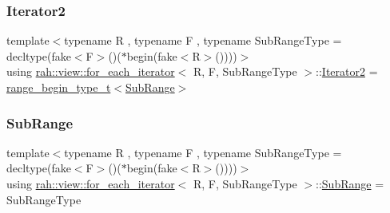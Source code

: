 \mbox{\label{structrah_1_1view_1_1for__each__iterator_a13108a8db132a8157375f81cf9b12ce1}} 
\subsubsection{\texorpdfstring{Iterator2}{Iterator2}}
{\footnotesize\ttfamily template$<$typename R , typename F , typename Sub\+Range\+Type  = decltype(fake$<$\+F$>$()($\ast$begin(fake$<$\+R$>$())))$>$ \\
using \mbox{\hyperlink{structrah_1_1view_1_1for__each__iterator}{rah\+::view\+::for\+\_\+each\+\_\+iterator}}$<$ R, F, Sub\+Range\+Type $>$\+::\mbox{\hyperlink{structrah_1_1view_1_1for__each__iterator_a13108a8db132a8157375f81cf9b12ce1}{Iterator2}} =  \mbox{\hyperlink{namespacerah_a28aff4eeddcece6be65ff0b956d32d4a}{range\+\_\+begin\+\_\+type\+\_\+t}}$<$\mbox{\hyperlink{structrah_1_1view_1_1for__each__iterator_a468008aa3006424aa1a71f7ca6a5d8bd}{Sub\+Range}}$>$}

\mbox{\label{structrah_1_1view_1_1for__each__iterator_a468008aa3006424aa1a71f7ca6a5d8bd}} 
\subsubsection{\texorpdfstring{SubRange}{SubRange}}
{\footnotesize\ttfamily template$<$typename R , typename F , typename Sub\+Range\+Type  = decltype(fake$<$\+F$>$()($\ast$begin(fake$<$\+R$>$())))$>$ \\
using \mbox{\hyperlink{structrah_1_1view_1_1for__each__iterator}{rah\+::view\+::for\+\_\+each\+\_\+iterator}}$<$ R, F, Sub\+Range\+Type $>$\+::\mbox{\hyperlink{structrah_1_1view_1_1for__each__iterator_a468008aa3006424aa1a71f7ca6a5d8bd}{Sub\+Range}} =  Sub\+Range\+Type}




